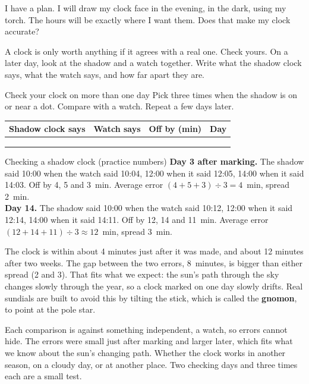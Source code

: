 \begin{multix}[hmm]\multixbot[hmm]\tcblower
I have a plan. I will draw my clock face in the evening, in the dark, using my torch. The hours will be exactly where I want them. Does that make my clock accurate?
\end{multix}

A clock is only worth anything if it agrees with a real one. Check yours. On a later day, look at the shadow and a watch together. Write what the shadow clock says, what the watch says, and how far apart they are.

\begin{tryit}{Check your clock on more than one day}
Pick three times when the shadow is on or near a dot. Compare with a watch. Repeat a few days later.\par\medskip
\renewcommand{\arraystretch}{1.6}
\begin{tabular}{|l|c|c|c|}
\hline
\textbf{Shadow clock says} & \textbf{Watch says} & \textbf{Off by (min)} & \textbf{Day}\\ \hline
 & & & \\ \hline
 & & & \\ \hline
 & & & \\ \hline
\end{tabular}
\end{tryit}

\begin{worked}{Checking a shadow clock (practice numbers)}
\textbf{Day 3 after marking.} The shadow said 10:00 when the watch said 10:04, 12:00 when it said 12:05, 14:00 when it said 14:03. Off by 4, 5 and 3~min. Average error $(4+5+3)\div3=4$~min, spread 2~min.\\
\textbf{Day 14.} The shadow said 10:00 when the watch said 10:12, 12:00 when it said 12:14, 14:00 when it said 14:11. Off by 12, 14 and 11~min. Average error $(12+14+11)\div3\approx12$~min, spread 3~min.
\end{worked}

The clock is within about 4 minutes just after it was made, and about 12 minutes after two weeks. The gap between the two errors, 8~minutes, is bigger than either spread (2 and 3). That fits what we expect: the sun's path through the sky changes slowly through the year, so a clock marked on one day slowly drifts. Real sundials are built to avoid this by tilting the stick, which is called the \textbf{gnomon}, to point at the pole star.

{Each comparison is against something independent, a watch, so errors cannot hide. The errors were small just after marking and larger later, which fits what we know about the sun's changing path.}
{Whether the clock works in another season, on a cloudy day, or at another place. Two checking days and three times each are a small test.}

